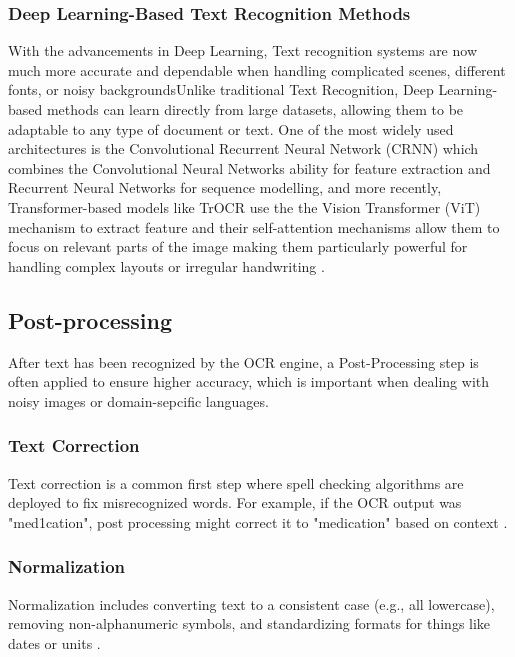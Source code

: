 \subsubsection{Deep Learning-Based Text Recognition Methods}
With the advancements in Deep Learning, Text recognition systems are now much more accurate and dependable when handling complicated scenes, different fonts, or noisy backgroundsUnlike traditional Text Recognition, Deep Learning-based methods can learn directly from large datasets, allowing them to be adaptable to any type of document or text.
One of the most widely used architectures is the Convolutional Recurrent Neural Network (CRNN)\cite{shi2017crnn} which combines the Convolutional Neural Networks ability for feature extraction and Recurrent Neural Networks for sequence modelling, and more recently, Transformer-based models like TrOCR use the the Vision Transformer (ViT)\cite{dosovitskiy2020image} mechanism to extract feature and their self-attention mechanisms allow them to focus on relevant parts of the image making them particularly powerful for handling complex layouts or irregular handwriting \cite{lecun1998gradient, graves2009offline}. %


    
\subsection{Post-processing}
After text has been recognized by the OCR engine, a Post-Processing step is often applied to ensure higher accuracy, which is important when dealing with noisy images or domain-sepcific languages.

\subsubsection{Text Correction}
Text correction is a common first step where spell checking algorithms are deployed to fix misrecognized words. For example, if the OCR output was "med1cation", post processing might correct it to "medication" based on context \cite{soper2021bart}.%

\subsubsection{Normalization}
Normalization includes converting text to a consistent case (e.g., all lowercase), removing non-alphanumeric symbols, and standardizing formats for things like dates or units \cite{duong2020unsupervised}.%

